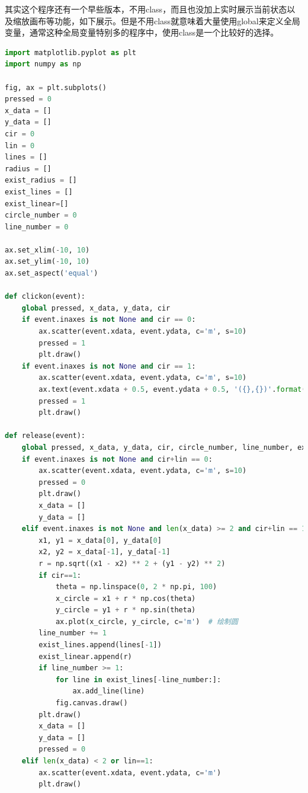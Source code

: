 \documentclass[12pt]{article}
\begin{document}
其实这个程序还有一个早些版本，不用class，而且也没加上实时展示当前状态以及缩放画布等功能，如下展示。但是不用class就意味着大量使用global来定义全局变量，通常这种全局变量特别多的程序中，使用class是一个比较好的选择。
\begin{lstlisting}[language=Python]
import matplotlib.pyplot as plt
import numpy as np

fig, ax = plt.subplots()
pressed = 0
x_data = []
y_data = []
cir = 0
lin = 0
lines = []
radius = []
exist_radius = []
exist_lines = []
exist_linear=[]
circle_number = 0
line_number = 0

ax.set_xlim(-10, 10)
ax.set_ylim(-10, 10)
ax.set_aspect('equal')

def clickon(event):
    global pressed, x_data, y_data, cir
    if event.inaxes is not None and cir == 0:
        ax.scatter(event.xdata, event.ydata, c='m', s=10)
        pressed = 1
        plt.draw()
    if event.inaxes is not None and cir == 1:
        ax.scatter(event.xdata, event.ydata, c='m', s=10)
        ax.text(event.xdata + 0.5, event.ydata + 0.5, '({},{})'.format(round(event.xdata, 2), round(event.ydata, 2)), fontdict={'fontsize': 10, 'fontweight': 'light', 'color': 'blue'})
        pressed = 1
        plt.draw()

def release(event):
    global pressed, x_data, y_data, cir, circle_number, line_number, exist_radius, exist_lines,exist_linear
    if event.inaxes is not None and cir+lin == 0:
        ax.scatter(event.xdata, event.ydata, c='m', s=10)
        pressed = 0
        plt.draw()
        x_data = []
        y_data = []
    elif event.inaxes is not None and len(x_data) >= 2 and cir+lin == 1:
        x1, y1 = x_data[0], y_data[0]
        x2, y2 = x_data[-1], y_data[-1]
        r = np.sqrt((x1 - x2) ** 2 + (y1 - y2) ** 2)
        if cir==1:
            theta = np.linspace(0, 2 * np.pi, 100)
            x_circle = x1 + r * np.cos(theta)
            y_circle = y1 + r * np.sin(theta)
            ax.plot(x_circle, y_circle, c='m')  # 绘制圆
        line_number += 1
        exist_lines.append(lines[-1])
        exist_linear.append(r)
        if line_number >= 1:
            for line in exist_lines[-line_number:]:
                ax.add_line(line)
            fig.canvas.draw()
        plt.draw()
        x_data = []
        y_data = []
        pressed = 0
    elif len(x_data) < 2 or lin==1:
        ax.scatter(event.xdata, event.ydata, c='m')
        plt.draw()


\end{lstlisting}
\end{document}
